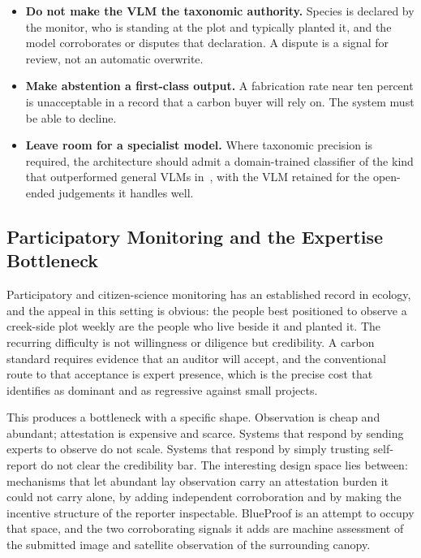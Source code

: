 \documentclass[10pt,twocolumn,a4paper]{article}
\begin{document}
\begin{itemize}
\item \textbf{Do not make the VLM the taxonomic authority.} Species is declared
by the monitor, who is standing at the plot and typically planted it, and the
model corroborates or disputes that declaration. A dispute is a signal for
review, not an automatic overwrite.
\item \textbf{Make abstention a first-class output.} A fabrication rate near ten
percent is unacceptable in a record that a carbon buyer will rely on. The system
must be able to decline.
\item \textbf{Leave room for a specialist model.} Where taxonomic precision is
required, the architecture should admit a domain-trained classifier of the kind
that outperformed general VLMs in~\cite{zhou2026}, with the VLM retained for the
open-ended judgements it handles well.
\end{itemize}

\subsection{Participatory Monitoring and the Expertise Bottleneck}

Participatory and citizen-science monitoring has an established record in
ecology, and the appeal in this setting is obvious: the people best positioned
to observe a creek-side plot weekly are the people who live beside it and
planted it. The recurring difficulty is not willingness or diligence but
credibility. A carbon standard requires evidence that an auditor will accept,
and the conventional route to that acceptance is expert presence, which is the
precise cost that~\cite{vanderheyden2026} identifies as dominant and as
regressive against small projects.

This produces a bottleneck with a specific shape. Observation is cheap and
abundant; attestation is expensive and scarce. Systems that respond by sending
experts to observe do not scale. Systems that respond by simply trusting
self-report do not clear the credibility bar. The interesting design space lies
between: mechanisms that let abundant lay observation carry an attestation
burden it could not carry alone, by adding independent corroboration and by
making the incentive structure of the reporter inspectable. BlueProof is an
attempt to occupy that space, and the two corroborating signals it adds are
machine assessment of the submitted image and satellite observation of the
surrounding canopy.
\end{document}
